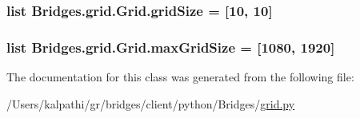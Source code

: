 \subsubsection[{grid\+Size}]{\setlength{\rightskip}{0pt plus 5cm}list Bridges.\+grid.\+Grid.\+grid\+Size = \mbox{[}10, 10\mbox{]}\hspace{0.3cm}{\ttfamily [static]}}\label{class_bridges_1_1grid_1_1_grid_a8bb23910448536eaaf3072a6c913561a}
\hypertarget{class_bridges_1_1grid_1_1_grid_a8e09ef4c3c53334dbb211dd2386e09c9}{}
\subsubsection[{max\+Grid\+Size}]{\setlength{\rightskip}{0pt plus 5cm}list Bridges.\+grid.\+Grid.\+max\+Grid\+Size = \mbox{[}1080, 1920\mbox{]}\hspace{0.3cm}{\ttfamily [static]}}\label{class_bridges_1_1grid_1_1_grid_a8e09ef4c3c53334dbb211dd2386e09c9}


The documentation for this class was generated from the following file\+:\begin{DoxyCompactItemize}
\item 
/\+Users/kalpathi/gr/bridges/client/python/\+Bridges/\hyperlink{grid_8py}{grid.\+py}\end{DoxyCompactItemize}
